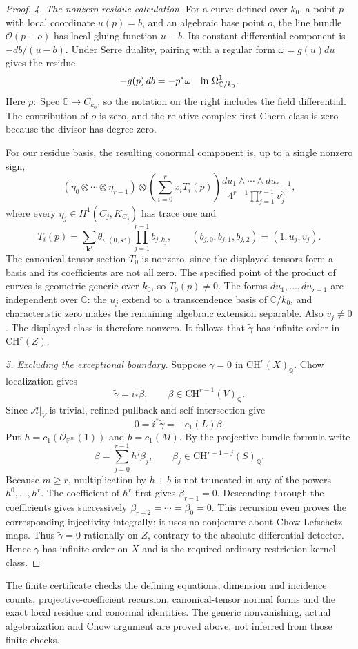\begin{proof}
\emph{4. The nonzero residue calculation.}
For a curve defined over $k_0$, a point $p$ with local
coordinate $u(p)=b$, and an algebraic base point $o$,
the line bundle $\mathcal O(p-o)$ has local gluing
function $u-b$. Its constant differential component is
$-db/(u-b)$. Under Serre duality, pairing with a regular
form $\omega=g(u)du$ gives the residue
\[
          -g(p)\,db=-p^*\omega
                        \quad\hbox{in }\Omega^1_{\mathbb C/k_0}.
\]
Here $p:\operatorname{Spec}\mathbb C\to C_{k_0}$,
so the notation on the right includes the field
differential. The contribution of $o$ is zero, and
the relative complex first Chern class is zero because
the divisor has degree zero.

For our residue basis, the resulting conormal component
is, up to a single nonzero sign,
\[
 (\eta_0\otimes\cdots\otimes\eta_{r-1})\otimes
 \left(\sum_{i=0}^{r}x_i T_i(p)\right)
 \frac{du_1\wedge\cdots\wedge du_{r-1}}
                   {4^{r-1}\prod_{j=1}^{r-1}v_j^3},
\]
where every $\eta_j\in H^1(C_j,K_{C_j})$ has trace one and
\[
 T_i(p)=\sum_{\mathbf k'}\theta_{i,(0,\mathbf k')}
                  \prod_{j=1}^{r-1}b_{j,k_j},
       \qquad (b_{j,0},b_{j,1},b_{j,2})=(1,u_j,v_j).
\]
The canonical tensor section $T_0$ is nonzero, since
the displayed tensors form a basis and its coefficients
are not all zero. The specified point of the product
of curves is geometric generic over $k_0$, so $T_0(p)\ne0$.
The forms $du_1,\ldots,du_{r-1}$ are independent over
$\mathbb C$: the $u_j$ extend to a transcendence basis
of $\mathbb C/k_0$, and characteristic zero makes the
remaining algebraic extension separable. Also $v_j\ne0$.
The displayed class is therefore nonzero. It follows
that $\widetilde\gamma$ has infinite order in
$\mathrm{CH}^r(Z)$.

\emph{5. Excluding the exceptional boundary.}
Suppose $\gamma=0$ in $\mathrm{CH}^r(X)_{\mathbb Q}$.
Chow localization gives
\[
               \widetilde\gamma=i_*\beta,
               \qquad\beta\in\mathrm{CH}^{r-1}(V)_{\mathbb Q}.
\]
Since $\mathcal A|_V$ is trivial, refined pullback and
self-intersection give
\[
                  0=i^*\widetilde\gamma=-c_1(L)\beta.
\]
Put $h=c_1(\mathcal O_{\mathbb P^m}(1))$ and
$b=c_1(M)$. By the projective-bundle formula write
\[
                  \beta=\sum_{j=0}^{r-1}h^j\beta_j,
              \qquad\beta_j\in\mathrm{CH}^{r-1-j}(S)_{\mathbb Q}.
\]
Because $m\ge r$, multiplication by $h+b$ is not
truncated in any of the powers $h^0,\ldots,h^r$.
The coefficient of $h^r$ first gives $\beta_{r-1}=0$.
Descending through the coefficients gives successively
$\beta_{r-2}=\cdots=\beta_0=0$. This recursion even
proves the corresponding injectivity integrally; it
uses no conjecture about Chow Lefschetz maps.
Thus $\widetilde\gamma=0$ rationally on $Z$, contrary
to the absolute differential detector. Hence $\gamma$
has infinite order on $X$ and is the required ordinary
restriction kernel class.
\end{proof}

The finite certificate checks the defining equations,
dimension and incidence counts, projective-coefficient
recursion, canonical-tensor normal forms and the exact
local residue and conormal identities. The generic
nonvanishing, actual algebraization and Chow argument
are proved above, not inferred from those finite checks.
